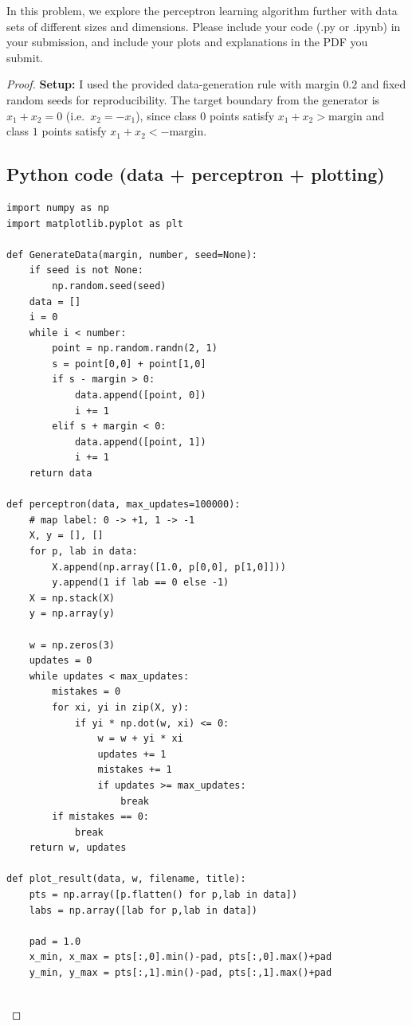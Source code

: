\documentclass[en,hazy,blue,12pt,normal]{elegantnote}
\begin{document}
\begin{homework}
     In this problem, we explore the perceptron learning algorithm further with data sets of different sizes and dimensions. Please include your code (.py or .ipynb) in your submission, and include your plots and explanations in the PDF you submit.
\end{homework}

\begin{proof}
    \textbf{Setup:} I used the provided data-generation rule with margin $0.2$ and fixed random seeds for reproducibility.
The target boundary from the generator is $x_1+x_2=0$ (i.e.\ $x_2=-x_1$), since class $0$ points satisfy $x_1+x_2>\text{margin}$ and class $1$ points satisfy $x_1+x_2<-\text{margin}$.

\subsection*{Python code (data + perceptron + plotting)}
\begin{verbatim}
import numpy as np
import matplotlib.pyplot as plt

def GenerateData(margin, number, seed=None):
    if seed is not None:
        np.random.seed(seed)
    data = []
    i = 0
    while i < number:
        point = np.random.randn(2, 1)
        s = point[0,0] + point[1,0]
        if s - margin > 0:
            data.append([point, 0])
            i += 1
        elif s + margin < 0:
            data.append([point, 1])
            i += 1
    return data

def perceptron(data, max_updates=100000):
    # map label: 0 -> +1, 1 -> -1
    X, y = [], []
    for p, lab in data:
        X.append(np.array([1.0, p[0,0], p[1,0]]))
        y.append(1 if lab == 0 else -1)
    X = np.stack(X)
    y = np.array(y)

    w = np.zeros(3)
    updates = 0
    while updates < max_updates:
        mistakes = 0
        for xi, yi in zip(X, y):
            if yi * np.dot(w, xi) <= 0:
                w = w + yi * xi
                updates += 1
                mistakes += 1
                if updates >= max_updates:
                    break
        if mistakes == 0:
            break
    return w, updates

def plot_result(data, w, filename, title):
    pts = np.array([p.flatten() for p,lab in data])
    labs = np.array([lab for p,lab in data])

    pad = 1.0
    x_min, x_max = pts[:,0].min()-pad, pts[:,0].max()+pad
    y_min, y_max = pts[:,1].min()-pad, pts[:,1].max()+pad


\end{verbatim}
\end{proof}
\end{document}
